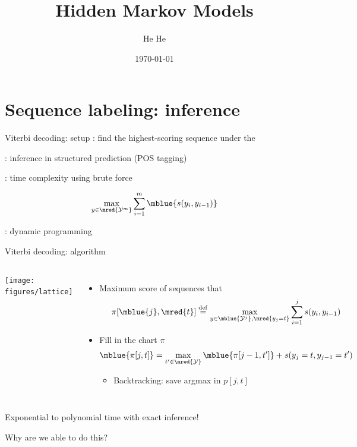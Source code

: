 \documentclass[usenames,dvipsnames,notes,11pt,aspectratio=169]{beamer}
\title[CSCI-GA.2590]{Hidden Markov Models}
\author[He He]{He He
}
\institute[NYU]{New York University}
\date{\today}
\newcommand{\pdfnote}[1]{}
\begin{document}
\begin{frame}
\titlepage
\end{frame}

\section{Sequence labeling: inference}

\begin{frame}
    {Viterbi decoding: setup}
    : find the highest-scoring sequence under the 

    : inference in structured prediction (\eg POS tagging)

    :  time complexity using brute force 

    $$
    \max_{y\in\mred{\sY^m}} \sum_{i=1}^m \mblue{s(y_i,y_{i-1})}
    $$

    : dynamic programming
\end{frame}

\begin{frame}
    {Viterbi decoding: algorithm}
    \begin{columns}
        \texttt{[image: figures/lattice]}
        \begin{itemize}
            \item Maximum score of  sequences that 
                $$
                \pi[\mblue{j}, \mred{t}] \eqdef \max_{y\in\mblue{\sY^j}, \mred{y_j=t}} \sum_{i=1}^j s(y_i, y_{i-1})
                $$
            \item Fill in the chart $\pi$ 
                $$
                \mblue{\pi[j, t]} = \max_{t'\in\mred{\sY}} \mblue{\pi[j-1, t']} + s(y_j=t, y_{j-1}=t')
                $$
                \vspace{-1em}
                \begin{itemize}
                    \item Backtracking: save argmax in $p[j,t]$
                \end{itemize}
        \end{itemize}
    \end{columns}

    Exponential to polynomial time with exact inference!

    Why are we able to do this?
    \pdfnote{Where were we able to do this? Is this free lunch? pairwise scoring function}
\end{frame}
\end{document}
